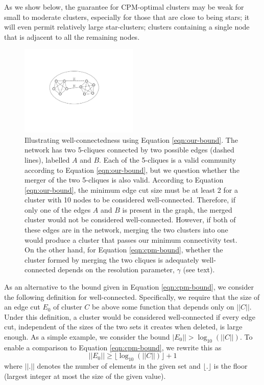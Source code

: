 \documentclass[11pt]{article}   	%
\begin{document}
As we show below, the guarantee for CPM-optimal clusters may be weak for small to moderate clusters, especially for those that are close to being stars; it will even permit relatively
large star-clusters; clusters containing a single node that is adjacent to all the remaining nodes.

\begin{figure}[h!]
\centering
\includegraphics[width=0.5\textwidth]{figs/fig_clique.pdf}
\caption{Illustrating well-connectedness using Equation \ref{eqn:our-bound}. The network has two 5-cliques connected by two possible edges (dashed lines), labelled $A$ and $B$.
Each of the 5-cliques is a valid community according to Equation \ref{eqn:our-bound}, but we question whether the merger of the two 5-cliques is also valid.
According to Equation \ref{eqn:our-bound}, the minimum edge cut size  must be at least 2 for a cluster with 10 nodes to be considered well-connected.
Therefore, if only one of the edges $A$ and $B$ is present in the graph, the merged cluster  would not  be considered well-connected.
However, if both of these edges are in the network, merging the two clusters into one would produce a cluster that passes our minimum connectivity test.
On the other hand, for Equation \ref{eqn:cpm-bound}, whether the cluster formed by merging the two cliques is adequately well-connected depends on the resolution parameter, $\gamma$ (see text).}
\label{fig:2cliques}
\end{figure}

As an alternative to the bound given in Equation \ref{eqn:cpm-bound},  we consider the
following definition for well-connected.
Specifically, we require that the size of an edge cut  $E_0$  of cluster $C$ be above some function that depends only on $||C||$.
Under this definition, a cluster would be considered well-connected if every edge cut, independent of the sizes of the
two sets it creates when deleted, is large enough.
As a simple example, we consider the bound $|E_0|| > \log_{10}(||C||)$.  To enable a comparison to Equation \ref{eqn:cpm-bound}, we rewrite this  as
\begin{equation}
  ||E_0|| \geq  \lfloor \log_{10}(||C||) \rfloor +1
  \label{eqn:our-bound}
  \end{equation}
where $||.||$ denotes the number of elements in the given set and
$\lfloor . \rfloor$ is the floor (largest integer at most the size of the given value).
\end{document}

